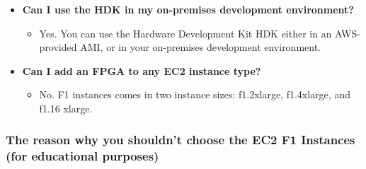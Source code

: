 \documentclass[a4paper]{article}
\begin{document}
\begin{itemize}
        \item[\ding{42}]
        \label{Can I use the HDK in my on-premises development environment?}
        \hypertarget{Can I use the HDK in my on-premises development environment?}{\textbf{Can I use the HDK in my on-premises development environment?}}
        \begin{itemize}
            \item[\ding{45}] Yes. You can use the Hardware Development Kit HDK either in an AWS-provided AMI, or in your on-premises development environment.
        \end{itemize}

        \item[\ding{42}]
        \label{Can I add an FPGA to any EC2 instance type?}
        \hypertarget{Can I add an FPGA to any EC2 instance type?}{\textbf{Can I add an FPGA to any EC2 instance type?}}
        \begin{itemize}
            \item[\ding{45}] No. F1 instances comes in two instance sizes: f1.2xlarge, f1.4xlarge, and f1.16 xlarge.
        \end{itemize}
    \end{itemize}
    
    \newpage

    \subsubsection{The reason why you shouldn't choose the EC2 F1 Instances (for educational purposes)}
\end{document}

